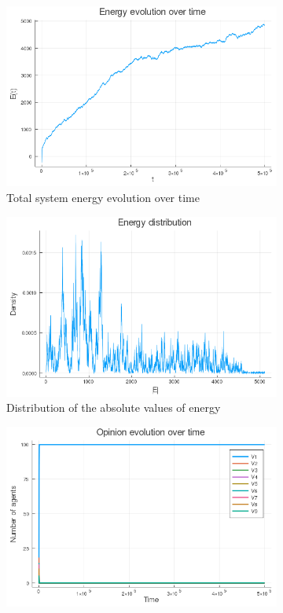 \documentclass[12pt,openright,twoside]{book}
\begin{document}
\begin{appendices}
\begin{figure}[!htb]
\centering
\begin{subfigure}[b]{0.65\linewidth}
    \includegraphics[width=\linewidth]{figures/2_1/energy_evolution.png}
    \caption{Total system energy evolution over time}
\end{subfigure}
\begin{subfigure}[b]{0.65\linewidth}
    \includegraphics[width=\linewidth]{figures/2_1/energy_distribution.png}
    \caption{Distribution of the absolute values of energy}
\end{subfigure}
\begin{subfigure}[b]{0.65\linewidth}
    \includegraphics[width=\linewidth]{figures/2_1/vote_evolution.png}

\end{subfigure}
\end{figure}
\end{appendices}
\end{document}

